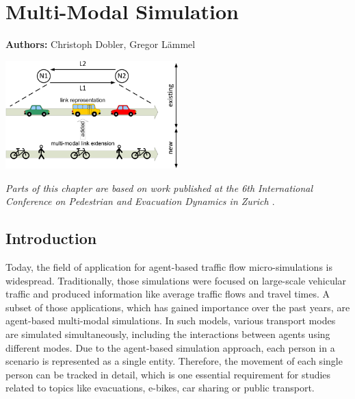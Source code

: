 \chapter{Multi-Modal Simulation}
\label{ch:multimodalsim}

\hfill \textbf{Authors:} Christoph Dobler, Gregor Lämmel

\begin{center} \includegraphics[width=0.5\textwidth, angle=0]{extending/figures/MultiModalSimulation/multi-modal-link-extension} \end{center}


\textit{Parts of this chapter are based on work published at the 6th International Conference on Pedestrian and Evacuation Dynamics in Zurich  \citep{DoblerLaemmel_PED_2012}}.


\section{Introduction}
Today, the field of application for agent-based traffic flow micro-simulations is widespread. Traditionally, those simulations were focused on large-scale vehicular traffic and produced information like average traffic flows and travel times. A subset of those applications, which has gained importance over the past years, are agent-based multi-modal simulations. In such models, various transport modes are simulated simultaneously, including the interactions between agents using different modes. Due to the agent-based simulation approach, each person in a scenario is represented as a single entity. Therefore, the movement of each single person can be tracked in detail, which is one essential requirement for studies related to topics like evacuations, e-bikes, car sharing or public transport.


